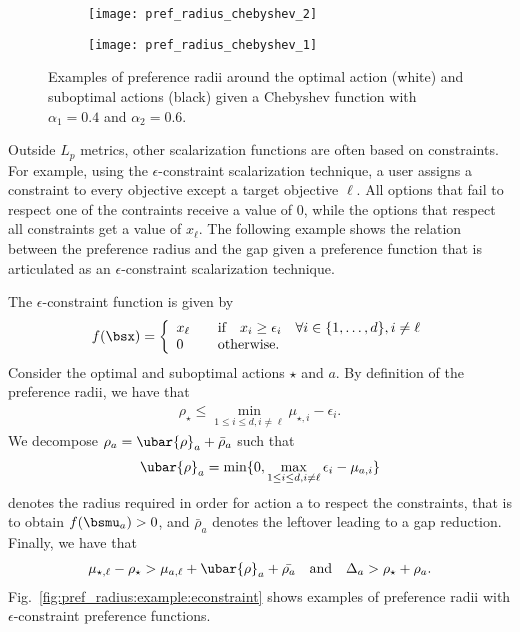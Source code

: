 \begin{figure}[t]
    \centering
    \begin{subfigure}[b]{0.35\textwidth}
        \texttt{[image: pref\_radius\_chebyshev\_2]}
    \end{subfigure}
    \qquad
    \begin{subfigure}[b]{0.35\textwidth}
        \texttt{[image: pref\_radius\_chebyshev\_1]}
    \end{subfigure}
    \caption{Examples of preference radii around the optimal action (white) and suboptimal actions (black) given a Chebyshev function with $\alpha_1 = 0.4$ and $\alpha_2 = 0.6$.}
\label{fig:pref_radius:example:chebyshev}
\end{figure}

Outside $L_p$ metrics, other scalarization functions are often based on constraints. For example, using the $\epsilon$-constraint scalarization technique, a user assigns a constraint to every objective except a target objective $\ell$. All options that fail to respect one of the contraints receive a value of 0, while the options that respect all constraints get a value of $x_\ell$. The following example shows the relation between the preference radius and the gap given a preference function that is articulated as an $\epsilon$-constraint scalarization technique.
%
\begin{example}
\label{ex:epsilon-constraint}
    The $\epsilon$-constraint function is given by
    \begin{align*}
    f(\bsx) = \bigg\{
        \begin{array}{ll}
        x_\ell & \quad \text{if} \quad x_i \geq \epsilon_i \quad \forall i \in \{ 1, \dots, d \}, i \neq \ell \\
        0 & \quad \text{otherwise}.
        \end{array}
    \end{align*}
    Consider the optimal and suboptimal actions $\star$ and $a$. By definition of the preference radii, we have that
    \begin{align*}
        \rho_\star \leq \min_{1 \leq i \leq d, i \neq \ell} \mu_{\star, i} - \epsilon_i.
    \end{align*}
    We decompose $\rho_a = \ubar{\rho}_a + \bar{\rho}_a$ such that
    \begin{align*}
        \ubar{\rho}_a = \min \{ 0, \max_{1 \leq i \leq d, i \neq \ell} \epsilon_i - \mu_{a, i} \}
    \end{align*}
    denotes the radius required in order for action a to respect the constraints, that is to obtain $f(\bsmu_a) > 0$, and $\bar{\rho}_a$ denotes the leftover leading to a gap reduction. Finally, we have that
    \begin{align*}
        \mu_{\star, \ell} - \rho_\star > \mu_{a, \ell} + \ubar{\rho}_a + \bar{\rho_a} \quad \text{and} \quad
        \Delta_a > \rho_\star + \rho_a.
    \end{align*}
    Fig.~\ref{fig:pref_radius:example:econstraint} shows examples of preference radii with $\epsilon$-constraint preference functions.
\end{example}


